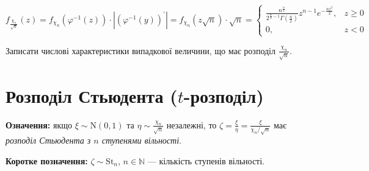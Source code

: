 \begin{equation*}
    f_{\frac{\chi_n}{\sqrt{n}}}(z) = f_{\chi_n}\left(\varphi^{-1} (z)\right) \cdot \left|\left(\varphi^{-1} (y) \right)^{\prime}\right| =
f_{\chi_n}(z \sqrt{n}) \cdot \sqrt{n} = 
\begin{cases}
    \frac{n^{\frac{n}{2}}}{2^{\frac{n}{2} - 1} \Gamma\left(\frac{n}{2}\right)} z^{n-1} e^{-\frac{nz^2}{2}}, & z \geq 0 \\
    0, & z < 0
\end{cases}
\end{equation*}
\begin{exercise}
    Записати числові характеристики випадкової величини, що має розподіл $\frac{\chi_n}{\sqrt{n}}$.
\end{exercise}

\section{Розподіл Стьюдента (\texorpdfstring{$t$}{t}-розподіл)}
\noindent\textbf{Означення:} якщо $\xi \sim \mathrm{N}(0, 1)$ та $\eta \sim \frac{\chi_n}{\sqrt{n}}$ незалежні,
то $\zeta = \frac{\xi}{\eta} = \frac{\xi}{\chi_n /\sqrt{n}}$ має \emph{розподіл Стьюдента з $n$ ступенями вільності}.

\noindent\textbf{Коротке позначення:} $\zeta \sim \mathrm{St}_n$, $n\in\mathbb{N}$ --- кількість ступенів вільності.


